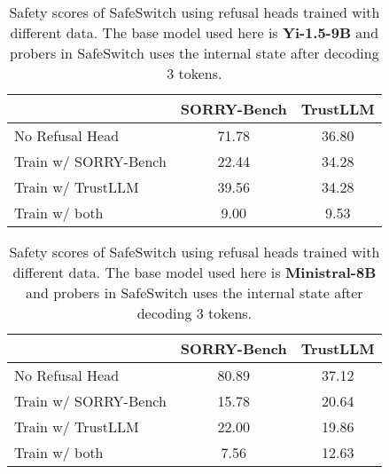 \begin{table}[]
\caption{Safety scores of SafeSwitch using refusal heads trained with different data. The base model used here is \textbf{Yi-1.5-9B} and probers in SafeSwitch uses the internal state after decoding 3 tokens.}
\vspace{2mm}
\centering
\renewcommand{\arraystretch}{1.1}
\begin{tabular}{lcc}
\hline
& SORRY-Bench & TrustLLM \\\hline
No Refusal Head   & 71.78           & 36.80        \\
Train w/ SORRY-Bench            & 22.44           &  34.28     \\
Train w/ TrustLLM               & 39.56          & 34.28       \\
Train w/ both   & 9.00          & 9.53      \\\hline
\end{tabular}
\end{table}


\begin{table}[]
\caption{Safety scores of SafeSwitch using refusal heads trained with different data. The base model used here is \textbf{Ministral-8B} and probers in SafeSwitch uses the internal state after decoding 3 tokens.}
\vspace{2mm}
\centering
\renewcommand{\arraystretch}{1.1}
\begin{tabular}{lcc}
\hline
& SORRY-Bench & TrustLLM \\\hline
No Refusal Head   & 80.89           & 37.12        \\
Train w/ SORRY-Bench            & 15.78           &  20.64     \\
Train w/ TrustLLM               & 22.00           & 19.86       \\
Train w/ both   & 7.56           & 12.63      \\\hline
\end{tabular}
\end{table}

